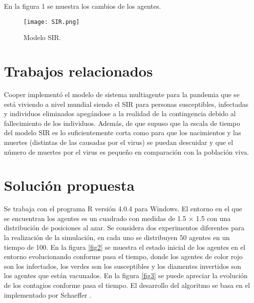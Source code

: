 \documentclass[final,6p,times,twocolumn]{elsarticle}
\begin{document}
En la figura 1 se muestra los cambios de los agentes.

\begin{figure} [h!]
\label{sir}
\centering
\texttt{[image: SIR.png]}
\caption{Modelo SIR.}
\end{figure}





\label{S:2.1}






\section{Trabajos relacionados}
\label{S:trela}
Cooper \cite{COOPER2020110057} implementó el modelo de sistema multiagente para la pandemia que se está viviendo a nivel mundial siendo el SIR para personas susceptibles, infectadas y individuos eliminados apegándose a la realidad de la contingencia debido al fallecimiento de los individuos. Además, de que supuso que la escala de tiempo del modelo SIR es lo suficientemente corta como para que los nacimientos y las muertes (distintas de las causadas por el virus) se puedan descuidar y que el número de muertes por el virus es pequeño en comparación con la población viva.


\section{Solución propuesta}
\label{S:Sprop}
Se trabaja con el programa R versión 4.0.4 \cite{R} para Windows.
El entorno en el que se encuentran los agentes es un cuadrado con medidas de 1.5 $\times$ 1.5 con una distribución de posiciones al azar. Se considera dos experimentos diferentes para la realización de la simulación, en cada uno se distribuyen 50 agentes en un tiempo de 100. En la figura \ref{fig2} se muestra el estado inicial de los agentes en el entorno evolucionando conforme pasa el tiempo, donde los agentes de color rojo son los infectados, los verdes son los susceptibles y los diamentes invertidos son los agentes que están vacunados. En la figura \ref{fig3} se puede apreciar la evolución de los contagios conforme pasa el tiempo. El desarrollo del algoritmo se basa en el implementado por Schaeffer \cite{codigo}.
\end{document}
